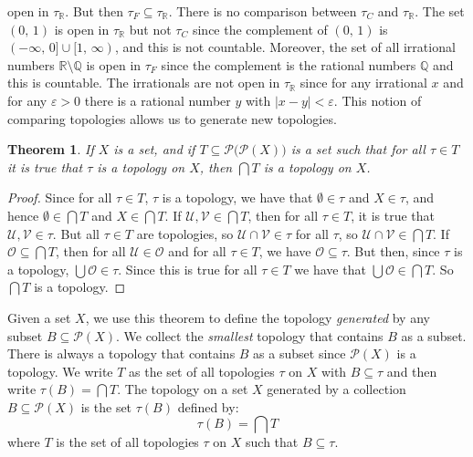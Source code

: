 \documentclass{article}
\theoremstyle{plain}
\newtheorem{theorem}{Theorem}[section]
\theoremstyle{normal}
\newenvironment{definition}{%
    \pushQED{\qed}\renewcommand{\qedsymbol}{$\blacksquare$}\definitionx%
}{%
    \popQED\enddefinitionx%
}
\begin{document}
    open in $\tau_{\mathbb{R}}$. But then
    $\tau_{F}\subseteq\tau_{\mathbb{R}}$. There is no comparison between
    $\tau_{C}$ and $\tau_{\mathbb{R}}$. The set
    $(0,\,1)$ is open in $\tau_{\mathbb{R}}$ but not $\tau_{C}$ since the
    complement of $(0,\,1)$ is $(-\infty,\,0]\cup[1,\,\infty)$, and this is
    not countable. Moreover, the set of all irrational numbers
    $\mathbb{R}\setminus\mathbb{Q}$ is open in $\tau_{F}$ since the
    complement is the rational numbers $\mathbb{Q}$ and this is countable.
    The irrationals are not open in $\tau_{\mathbb{R}}$ since for any
    irrational $x$ and for any $\varepsilon>0$ there is a rational number
    $y$ with $|x-y|<\varepsilon$. This notion of comparing topologies allows
    us to generate new topologies.
    \begin{theorem}
        If $X$ is a set, and if $T\subseteq\mathcal{P}\big(\mathcal{P}(X)\big)$
        is a set such that for all $\tau\in{T}$ it is true that
        $\tau$ is a topology on $X$, then $\bigcap{T}$ is a topology on $X$.
    \end{theorem}
    \begin{proof}
        Since for all $\tau\in{T}$, $\tau$ is a topology, we have that
        $\emptyset\in\tau$ and $X\in\tau$, and hence
        $\emptyset\in\bigcap{T}$ and $X\in\bigcap{T}$. If
        $\mathcal{U},\mathcal{V}\in\bigcap{T}$, then for all $\tau\in{T}$, it is
        true that $\mathcal{U},\mathcal{V}\in\tau$. But all $\tau\in{T}$ are
        topologies, so $\mathcal{U}\cap\mathcal{V}\in\tau$ for all $\tau$, so
        $\mathcal{U}\cap\mathcal{V}\in\bigcap{T}$. If
        $\mathcal{O}\subseteq\bigcap{T}$, then for all
        $\mathcal{U}\in\mathcal{O}$ and for all $\tau\in{T}$, we have
        $\mathcal{O}\subseteq\tau$. But then, since $\tau$ is a topology,
        $\bigcup\mathcal{O}\in\tau$. Since this is true for all $\tau\in{T}$ we
        have that $\bigcup\mathcal{O}\in\bigcap{T}$.
        So $\bigcap{T}$ is a topology.
    \end{proof}
    Given a set $X$, we use this theorem to define the topology
    \textit{generated} by any subset $B\subseteq\mathcal{P}(X)$. We collect the
    \textit{smallest} topology that contains $B$ as a subset. There is always
    a topology that contains $B$ as a subset since $\mathcal{P}(X)$ is a
    topology. We write $T$ as the set of all topologies $\tau$ on $X$ with
    $B\subseteq\tau$ and then write $\tau(B)=\bigcap{T}$.
    \begin{definition}[\textbf{Generated Topology}]
        The topology on a set $X$ generated by a collection
        $B\subseteq\mathcal{P}(X)$ is the set $\tau(B)$ defined by:
        \begin{equation}
            \tau(B)=\bigcap{T}
        \end{equation}
        where $T$ is the set of all topologies $\tau$ on $X$ such that
        $B\subseteq\tau$.
    \end{definition}
\end{document}
